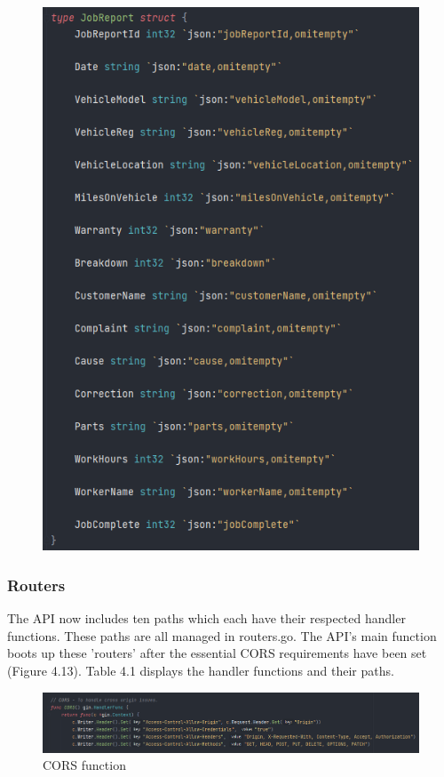 \begin{figure}[H]
\begin{minipage}[b]{0.45\linewidth}
    \includegraphics[width=1.0\textwidth]{images/horton/models/report_struct.png}
\end{minipage}
\end{figure}

\subsubsection{Routers}
The API now includes ten paths which each have their respected handler functions.
These paths are all managed in routers.go. The API's main function boots up these 'routers' after the essential CORS requirements have been set (Figure 4.13). Table 4.1 displays the handler functions and their paths.  

\begin{figure}[H]
    \caption{CORS function}
    \label{image:cors-req}
    \centering
    \includegraphics[width=1.0\textwidth]{images/horton/cors.png}
\end{figure}

